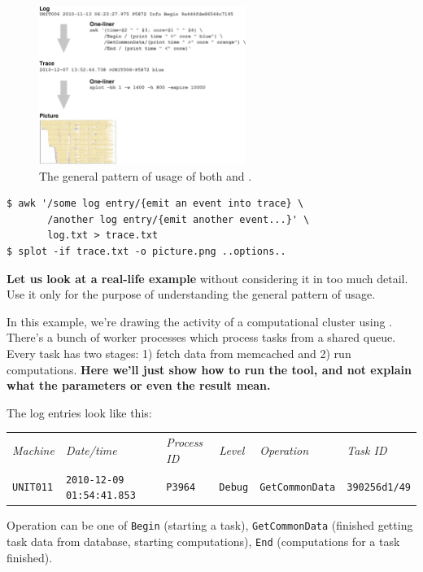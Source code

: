 \documentclass{article}
\begin{document}
\begin{figure}[t]
\center
\includegraphics[width=0.6\textwidth]{general-usage.pdf}
\caption{The general pattern of usage of both \timeplot{} and \splot{}.}
\label{fig:general-usage}
\end{figure}

\begin{verbatim}
$ awk '/some log entry/{emit an event into trace} \
       /another log entry/{emit another event...}' \
       log.txt > trace.txt
$ splot -if trace.txt -o picture.png ..options..
\end{verbatim}

\textbf{Let us look at a real-life example} without considering it in too much detail. Use it only for the purpose of understanding the general pattern of usage.
\pagebreak


In this example, we're drawing the activity of a computational cluster using \splot{}. There's a bunch of worker processes which process tasks from a shared queue. Every task has two stages: 1) fetch data from memcached and 2) run computations. \textbf{Here we'll just show how to run the tool, and not explain what the parameters or even the result mean.}

The log entries look like this:

\begin{tabular}{llllll}
\emph{Machine} & \emph{Date/time} & \emph{Process ID} & \emph{Level} & \emph{Operation} & \emph{Task ID} \\
\footnotesize{\texttt{UNIT011}} & \footnotesize{\texttt{2010-12-09 01:54:41.853}} & \footnotesize{\texttt{P3964}} & \footnotesize{\texttt{Debug}} & \footnotesize{\texttt{GetCommonData}} & \footnotesize{\texttt{390256d1/49}} \\
\end{tabular}

Operation can be one of \verb|Begin| (starting a task), \verb|GetCommonData| (finished getting task data from database, starting computations), \verb|End| (computations for a task finished).
\end{document}
